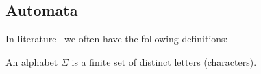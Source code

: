\subsection{Automata}
In literature~\cite{savage1998models} we often have the following definitions:

\begin{definition}[Alphabet]
  An alphabet \(\Sigma\) is a finite set of distinct
  letters (characters).
\end{definition}

\begin{definition}[Language]

\end{definition}


